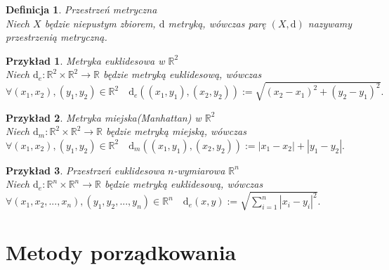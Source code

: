 \documentclass[12pt,a4paper]{report}
\newtheorem{definition}[theorem]{Definicja}
\newtheorem{example}{Przykład}
\begin{document}
\begin{definition}{Przestrzeń metryczna \cite[Rozdział 9]{kuratowski2004}\\}
Niech $X$ będzie niepustym zbiorem, $\mathrm{d}$ metryką, wówczas parę $(X,\mathrm{d})$ nazywamy przestrzenią metryczną. \\
\end{definition}

\begin{example}{Metryka euklidesowa w $\mathbb{R}^2$}\\
Niech $\mathrm{d}_e: \mathbb{R}^2 \times \mathbb{R}^2 \rightarrow \mathbb{R}$ będzie metryką euklidesową, wówczas \\$\forall{(x_{1},x_{2}),(y_{1},y_{2}) \in \mathbb{R}^2} \quad \mathrm{d}_e((x_1,y_1),(x_2,y_2)):= \sqrt{(x_2-x_1)^2+(y_2-y_1)^2}. $
\end{example}

\begin{example}{Metryka miejska(Manhattan) w $\mathbb{R}^2$}\\
Niech $\mathrm{d}_m: \mathbb{R}^2 \times \mathbb{R}^2 \rightarrow \mathbb{R}$ będzie metryką miejską, wówczas \\
$\forall{(x_{1},x_{2}),(y_{1},y_{2}) \in \mathbb{R}^2} \quad \mathrm{d}_m((x_1,y_1),(x_2,y_2)):=|x_1-x_2|+|y_1-y_2|.$\\
\end{example}

\begin{example}{Przestrzeń euklidesowa $n$-wymiarowa $\mathbb{R}^n$\\}
Niech $\mathrm{d}_e: \mathbb{R}^n \times \mathbb{R}^n \rightarrow \mathbb{R}$ będzie metryką euklidesową, wówczas\\   $\forall{(x_1,x_2,...,x_n),(y_1,y_2,...,y_n) \in \mathbb{R}^n} \quad \mathrm{d}_e(x,y):= \sqrt{\sum_{i=1}^{n} |x_i-y_i|^2}.$\
\end{example}



\chapter{Metody porządkowania}
\noindent
\end{document}
